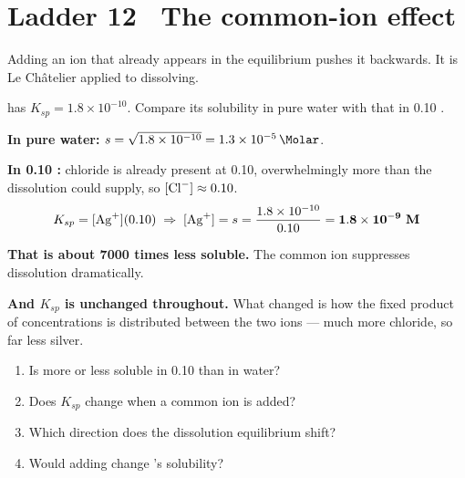 \documentclass{apchem-worksheet}
\begin{document}
\section*{\sffamily Ladder 12 \textbullet\ The common-ion effect}

Adding an ion that already appears in the equilibrium pushes it backwards.
It is Le Ch\^{a}telier applied to dissolving.

\begin{workedexample}
 has $K_{sp} = 1.8\times10^{-10}$. Compare its solubility in
pure water with that in \SI{0.10}{\Molar} .

\textbf{In pure water:}
$s = \sqrt{1.8\times10^{-10}} = \SI{1.3e-5}{\Molar}$.

\textbf{In \SI{0.10}{\Molar} :} chloride is already present at
\SI{0.10}{\Molar}, overwhelmingly more than the dissolution could supply,
so $[\ce{Cl-}] \approx 0.10$.
\[ K_{sp} = [\ce{Ag+}](0.10) \;\Rightarrow\;
   [\ce{Ag+}] = s = \frac{1.8\times10^{-10}}{0.10}
   = \mathbf{1.8\times10^{-9}~M} \]

\textbf{That is about 7000 times less soluble.} The common ion suppresses
dissolution dramatically.

\textbf{And $K_{sp}$ is unchanged throughout.} What changed is how the
fixed product of concentrations is distributed between the two ions ---
much more chloride, so far less silver.
\end{workedexample}

\begin{yourturn}
\begin{enumerate}[leftmargin=*,itemsep=0.5em]
  \item Is  more or less soluble in \SI{0.10}{\Molar}
         than in water? \workspace[1.6cm]
  \item Does $K_{sp}$ change when a common ion is added?
        \workspace[1.4cm]
  \item Which direction does the dissolution equilibrium shift?
        \workspace[1.4cm]
  \item Would adding  change 's solubility?
        \workspace[1.8cm]
\end{enumerate}
\end{yourturn}
\end{document}
